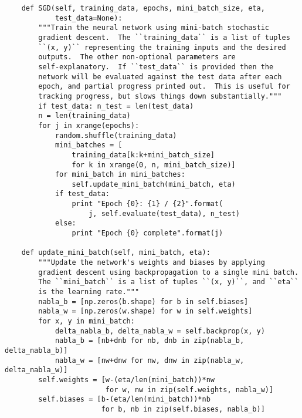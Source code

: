 \documentclass[11pt,a4j,fleqn]{jarticle}
\begin{document}
\begin{verbatim}
    def SGD(self, training_data, epochs, mini_batch_size, eta,
            test_data=None):
        """Train the neural network using mini-batch stochastic
        gradient descent.  The ``training_data`` is a list of tuples
        ``(x, y)`` representing the training inputs and the desired
        outputs.  The other non-optional parameters are
        self-explanatory.  If ``test_data`` is provided then the
        network will be evaluated against the test data after each
        epoch, and partial progress printed out.  This is useful for
        tracking progress, but slows things down substantially."""
        if test_data: n_test = len(test_data)
        n = len(training_data)
        for j in xrange(epochs):
            random.shuffle(training_data)
            mini_batches = [
                training_data[k:k+mini_batch_size]
                for k in xrange(0, n, mini_batch_size)]
            for mini_batch in mini_batches:
                self.update_mini_batch(mini_batch, eta)
            if test_data:
                print "Epoch {0}: {1} / {2}".format(
                    j, self.evaluate(test_data), n_test)
            else:
                print "Epoch {0} complete".format(j)

    def update_mini_batch(self, mini_batch, eta):
        """Update the network's weights and biases by applying
        gradient descent using backpropagation to a single mini batch.
        The ``mini_batch`` is a list of tuples ``(x, y)``, and ``eta``
        is the learning rate."""
        nabla_b = [np.zeros(b.shape) for b in self.biases]
        nabla_w = [np.zeros(w.shape) for w in self.weights]
        for x, y in mini_batch:
            delta_nabla_b, delta_nabla_w = self.backprop(x, y)
            nabla_b = [nb+dnb for nb, dnb in zip(nabla_b, delta_nabla_b)]
            nabla_w = [nw+dnw for nw, dnw in zip(nabla_w, delta_nabla_w)]
        self.weights = [w-(eta/len(mini_batch))*nw
                        for w, nw in zip(self.weights, nabla_w)]
        self.biases = [b-(eta/len(mini_batch))*nb
                       for b, nb in zip(self.biases, nabla_b)]


\end{verbatim}
\end{document}

